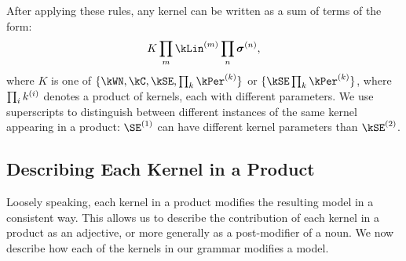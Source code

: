 After applying these rules, any kernel can be written as a sum of terms of the form:
\begin{align}
K \prod_m \kLin^{(m)} \prod_n \boldsymbol\sigma^{(n)},
\label{eq:sop}
\end{align}
where $K$ is one of $\{\kWN, \kC, \kSE, \prod_k \kPer^{(k)}\}$ or $\{\kSE \prod_k \kPer^{(k)}\}$, 
where $\prod_ik^{(i)}$ denotes a product of kernels, each with different parameters.
We use superscripts to distinguish between different instances of the same kernel appearing in a product: $\SE^{(1)}$ can have different kernel parameters than $\kSE^{(2)}$.



\subsection{Describing Each Kernel in a Product}

Loosely speaking, each kernel in a product modifies the resulting \gp{} model in a consistent way.
This allows us to describe the contribution of each kernel in a product as an adjective, or more generally as a post-modifier of a noun.
We now describe how each of the kernels in our grammar modifies a \gp{} model.

